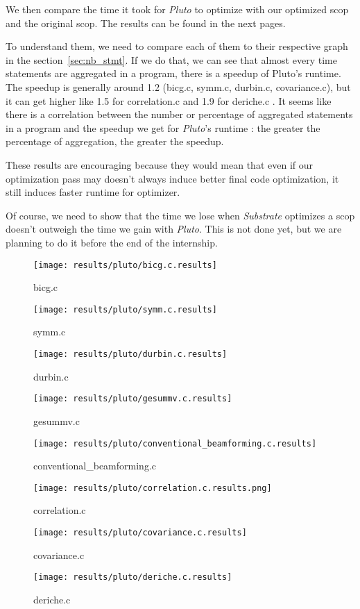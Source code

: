 \documentclass[paper=a4, fontsize=11.5pt]{scrartcl}
\numberwithin{equation}{section}        %
\numberwithin{figure}{section}          %
\numberwithin{table}{section}               %
\begin{document}
\bigskip

We then compare the time it took for \textit{Pluto} to optimize with our optimized scop and
the original scop. The results can be found in the next pages.

To understand them, we need to compare each of them to their respective graph in the section~\ref{sec:nb_stmt}.
If we do that, we can see that almost every time statements are aggregated in a program,
there is a speedup of Pluto's runtime. The speedup is generally around 1.2 (bicg.c, symm.c, durbin.c, covariance.c),
but it can get higher like 1.5 for correlation.c and 1.9 for deriche.c . It seems like there
is a correlation between the number or percentage of aggregated statements in a program and
the speedup we get for \textit{Pluto}'s runtime : the greater the percentage of aggregation,
the greater the speedup.

\bigskip

These results are encouraging because they would mean that even if our optimization pass
may doesn't always induce better final code optimization, it still induces faster runtime
for optimizer.

\bigskip

Of course, we need to show that the time we lose when \textit{Substrate} optimizes a scop
doesn't outweigh the time we gain with \textit{Pluto}. This is not done yet, but we are planning
to do it before the end of the internship.


\begin{figure}[H]
    \center
    \texttt{[image: results/pluto/bicg.c.results]}
    \caption{bicg.c}\label{fig:pluto:bicg}
    \texttt{[image: results/pluto/symm.c.results]}
    \caption{symm.c}\label{fig:pluto:symm}
\end{figure}
\begin{figure}[H]
    \center
    \texttt{[image: results/pluto/durbin.c.results]}
    \caption{durbin.c}\label{fig:pluto:durbin}
    \texttt{[image: results/pluto/gesummv.c.results]}
    \caption{gesummv.c}\label{fig:pluto:gesummv}
\end{figure}
\begin{figure}[H]
    \center
    \texttt{[image: results/pluto/conventional\_beamforming.c.results]}
    \caption{conventional\_beamforming.c}\label{fig:pluto:conv_beam}
    \texttt{[image: results/pluto/correlation.c.results.png]}
    \caption{correlation.c}\label{fig:pluto:correlation}
\end{figure}
\begin{figure}[H]
    \center
    \texttt{[image: results/pluto/covariance.c.results]}
    \caption{covariance.c}\label{fig:pluto:covariance}
    \texttt{[image: results/pluto/deriche.c.results]}
    \caption{deriche.c}\label{fig:pluto:deriche}
\end{figure}
\restoregeometry
\end{document}
